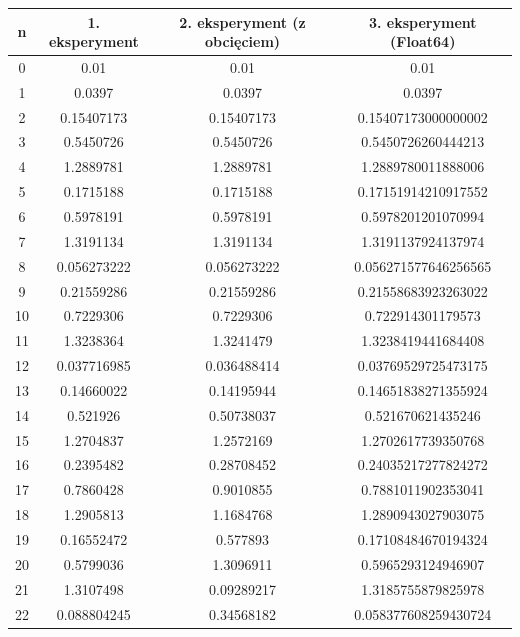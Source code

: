 \documentclass[15pt, a4paper]{article}
\begin{document}
\begin{longtable}{|c|c|c|c|}
        \hline
        n & 1. eksperyment & 2. eksperyment (z obcięciem) & 3. eksperyment (Float64) \\ \hline
        0 & 0.01 & 0.01 & 0.01 \\ \hline
        1 & 0.0397 & 0.0397 & 0.0397 \\ \hline
        2 & 0.15407173 & 0.15407173 & 0.15407173000000002 \\ \hline
        3 & 0.5450726 & 0.5450726 & 0.5450726260444213 \\ \hline
        4 & 1.2889781 & 1.2889781 & 1.2889780011888006 \\ \hline
        5 & 0.1715188 & 0.1715188 & 0.17151914210917552 \\ \hline
        6 & 0.5978191 & 0.5978191 & 0.5978201201070994 \\ \hline
        7 & 1.3191134 & 1.3191134 & 1.3191137924137974 \\ \hline
        8 & 0.056273222 & 0.056273222 & 0.056271577646256565 \\ \hline
        9 & 0.21559286 & 0.21559286 & 0.21558683923263022 \\ \hline
        10 & 0.7229306 & 0.7229306 & 0.722914301179573 \\ \hline
        11 & 1.3238364 & 1.3241479 & 1.3238419441684408 \\ \hline
        12 & 0.037716985 & 0.036488414 & 0.03769529725473175 \\ \hline
        13 & 0.14660022 & 0.14195944 & 0.14651838271355924 \\ \hline
        14 & 0.521926 & 0.50738037 & 0.521670621435246 \\ \hline
        15 & 1.2704837 & 1.2572169 & 1.2702617739350768 \\ \hline
        16 & 0.2395482 & 0.28708452 & 0.24035217277824272 \\ \hline
        17 & 0.7860428 & 0.9010855 & 0.7881011902353041 \\ \hline
        18 & 1.2905813 & 1.1684768 & 1.2890943027903075 \\ \hline
        19 & 0.16552472 & 0.577893 & 0.17108484670194324 \\ \hline
        20 & 0.5799036 & 1.3096911 & 0.5965293124946907 \\ \hline
        21 & 1.3107498 & 0.09289217 & 1.3185755879825978 \\ \hline
        22 & 0.088804245 & 0.34568182 & 0.058377608259430724 \\ \hline

\end{longtable}
\end{document}
